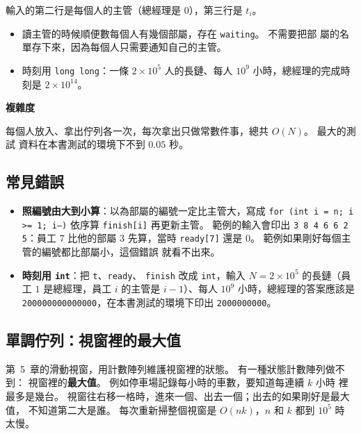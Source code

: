 
輸入的第二行是每個人的主管（總經理是 $0$），第三行是 $t_i$。

\begin{itemize}
\item 讀主管的時候順便數每個人有幾個部屬，存在 \texttt{waiting}。 不需要把部
屬的名單存下來，因為每個人只需要通知自己的主管。
\item 時刻用 \texttt{long long}：一條 $2 \times 10^5$ 人的長鏈、每人 $10^9$
小時，總經理的完成時刻是 $2 \times 10^{14}$。
\end{itemize}

\textbf{複雜度}

每個人放入、拿出佇列各一次，每次拿出只做常數件事，總共 $O(N)$。 最大的測試
資料在本書測試的環境下不到 $0.05$ 秒。

\subsection{常見錯誤}

\begin{itemize}
\item \textbf{照編號由大到小算}：以為部屬的編號一定比主管大，寫成
\texttt{for (int i = n; i >= 1; i--)} 依序算 \texttt{finish[i]} 再更新主管。
範例的輸入會印出 \texttt{3 8 4 6 6 2 5}：員工 $7$ 比他的部屬 $3$ 先算，當時
\texttt{ready[7]} 還是 $0$。 範例如果剛好每個主管的編號都比部屬小，這個錯誤
就看不出來。
\item \textbf{時刻用 \texttt{int}}：把 \texttt{t}、\texttt{ready}、
\texttt{finish} 改成 \texttt{int}，輸入 $N = 2 \times 10^5$ 的長鏈（員工 $1$
是總經理，員工 $i$ 的主管是 $i - 1$）、每人 $10^9$ 小時，總經理的答案應該是
\texttt{200000000000000}，在本書測試的環境下印出 \texttt{2000000000}。
\end{itemize}

\subsection{單調佇列：視窗裡的最大值}
\label{sec:mono-queue}

第~5~章的滑動視窗，用計數陣列維護視窗裡的狀態。 有一種狀態計數陣列做不到：
視窗裡的\textbf{最大值}。 例如停車場記錄每小時的車數，要知道每連續 $k$ 小時
裡最多是幾台。 視窗往右移一格時，進來一個、出去一個；出去的如果剛好是最大值，
不知道第二大是誰。 每次重新掃整個視窗是 $O(nk)$，$n$ 和 $k$ 都到 $10^5$ 時
太慢。

